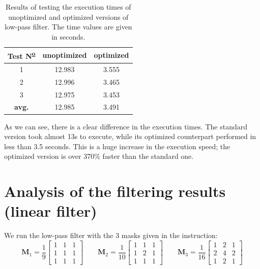 \documentclass[12pt]{article}
\begin{document}
\begin{table}[ht]\centering
    \begin{tabular}{ccc}
        \toprule
        Test N\textsuperscript{\underline{o}} & unoptimized & optimized \\\midrule
        1                                     & 12.983      & 3.555     \\
        2                                     & 12.996      & 3.465     \\
        3                                     & 12.975      & 3.453     \\\midrule
        \bf avg.                              & 12.985      & 3.491     \\
        \bottomrule
    \end{tabular}
    \caption{Results of testing the execution times of unoptimized and optimized versions of low-pass filter.
        The time values are given in seconds.}
    \label{tab:lowpass-execution-time}
\end{table}

As we can see, there is a clear difference in the execution times.
The standard version took almost 13s to execute, while its optimized counterpart performed in less than 3.5 seconds.
This is a huge increase in the execution speed; the optimized version is over 370\% faster than the standard one.

\section{Analysis of the filtering results (linear filter)}

We run the low-pass filter with the 3 masks given in the instruction:
\begin{equation*}
    \mathbf{M}_1 = \frac{1}{9}\begin{bmatrix}
        1 & 1 & 1 \\
        1 & 1 & 1 \\
        1 & 1 & 1
    \end{bmatrix}
    \qquad
    \mathbf{M}_2 = \frac{1}{10}\begin{bmatrix}
        1 & 1 & 1 \\
        1 & 2 & 1 \\
        1 & 1 & 1
    \end{bmatrix}
    \qquad
    \mathbf{M}_3 = \frac{1}{16}\begin{bmatrix}
        1 & 2 & 1 \\
        2 & 4 & 2 \\
        1 & 2 & 1
    \end{bmatrix}
\end{equation*}
\end{document}
